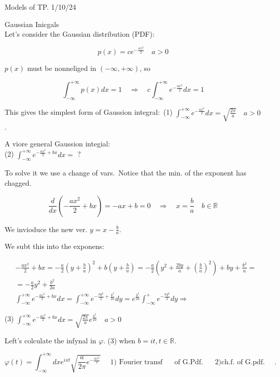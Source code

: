 Models of TP. 1/10/24

Gaussian Inicgals\\
Let's consider the Gaussian distribution (PDF):

$$ 
p(x)=c e^{-\frac{a x^{2}}{2}} \quad a>0
$$ 

$p(x)$ must be nonneliged in $(-\infty,+\infty)$, so

$$ 
\int_{-\infty}^{+\infty} p(x) d x=1 \quad \Rightarrow \quad c \int_{-\infty}^{+\infty} e^{-\frac{a x^{2}}{2}} d x=1
$$ 

This gives the simplest form of Gaussion integral:\
(1) \quad $\int_{-\infty}^{+\infty} e^{-\frac{a x^{2}}{2}} d x=\sqrt{\frac{2 \pi}{a}} \quad a>0$.

A viore general Gaussion integial:\\
(2) \quad $\int_{-\infty}^{+\infty} e^{-\frac{a x^{2}}{2}+b x} d x=$ ?

To solve it we use a change of vars.\
Notice that the min. of the exponent has chagged.

$$ 
\frac{d}{d x}\left(-\frac{a x^{2}}{2}+b x\right)=-a x+b=0 \quad \Rightarrow \quad x=\frac{b}{a} \quad b \in \mathbb{R}
$$ 

We invioduce the new ver. $y=x-\frac{b}{a}$.

We subt this into the exponens:

$$ 
\begin{aligned}
&-\frac{a x^{2}}{2}+b x=-\frac{a}{2}\left(y+\frac{b}{a}\right)^{2}+b\left(y+\frac{b}{a}\right)=-\frac{a}{2}\left(y^{2}+\frac{2 b y}{a}+\left(\frac{b}{a}\right)^{2}\right)+b y+\frac{b^{2}}{a}=\\
&=-\frac{a}{2} y^{2}+\frac{b^{2}}{2 a} \\
& \int_{-\infty}^{+\infty} e^{-\frac{a x^{2}}{2}+b x} d x=\int_{-\infty}^{+\infty} e^{-\frac{a y^{2}}{2}+\frac{b^{2}}{2 a}} d y=e^{\frac{b^{2}}{2 a}} \int_{-\infty}^{+} e^{-\frac{a y^{2}}{2}} d y \Rightarrow
\end{aligned}
$$ 

(3) \quad $\int_{-\infty}^{+\infty} e^{-\frac{a x^{2}}{2}+b x} d x=\sqrt{\frac{2 \pi}{a}} e^{\frac{b^{2}}{2 a}} \quad a>0$

Left's colculate the infynal in $\varphi$. (3) when $b=i t, t \in \mathbb{R}$.

$$ 
\varphi(t)=\int_{-\infty}^{+\infty} d x e^{i x t} \sqrt{\frac{a}{2 \pi} e^{-\frac{a x^{2}}{2}}} \quad \text { 1) Fourier transf } \quad \text { of G.Pdf. } \quad \text { 2)ch.f. of G.pdf. } \quad .
$$ 

